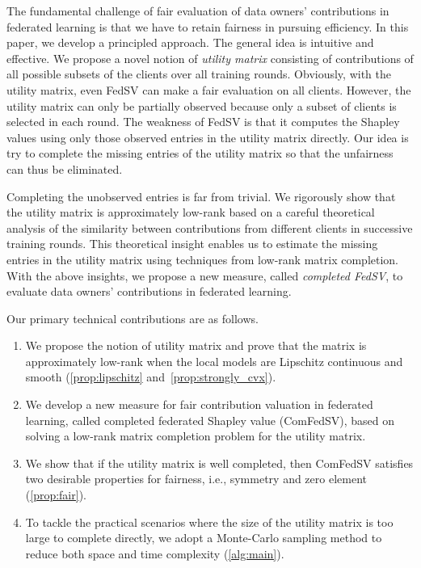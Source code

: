 The fundamental challenge of fair evaluation of data owners' contributions in federated learning is that we have to retain fairness in pursuing efficiency. In this paper, we develop a principled approach. The general idea is intuitive and effective.  We propose a novel notion of \emph{utility matrix} consisting of contributions of all possible subsets of the clients over all training rounds. Obviously, with the utility matrix, even FedSV can make a fair evaluation on all clients.  However, the utility matrix can only be partially observed because only a subset of clients is selected in each round. The weakness of FedSV is that it computes the Shapley values using only those observed entries in the utility matrix directly. Our idea is try to complete the missing entries of the utility matrix so that the unfairness can thus be eliminated. 

Completing the unobserved entries is far from trivial. We rigorously show that the utility matrix is approximately low-rank based on a careful theoretical analysis of the similarity between contributions from different clients in successive training rounds. This theoretical insight enables us to estimate the missing entries in the utility matrix using techniques from low-rank matrix completion.  With the above insights, we propose a new measure, called \emph{completed FedSV}, to evaluate data owners' contributions in federated learning. 

Our primary technical contributions are as follows.

\begin{enumerate}
    \item We propose the notion of utility matrix and prove that the matrix is approximately low-rank when the local models are Lipschitz continuous and smooth (\autoref{prop:lipschitz} and~\autoref{prop:strongly_cvx}). 
    \item We develop a new measure for fair contribution valuation in federated learning, called completed federated Shapley value (ComFedSV), based on solving a low-rank matrix completion problem for the utility matrix. 
    \item We show that if the utility matrix is well completed, then ComFedSV satisfies two desirable properties for fairness, i.e., symmetry and zero element (\autoref{prop:fair}).
    \item To tackle the practical scenarios where the size of the utility matrix is too large to complete directly, we adopt a Monte-Carlo sampling method to reduce both space and time complexity (\autoref{alg:main}).  
\end{enumerate}

